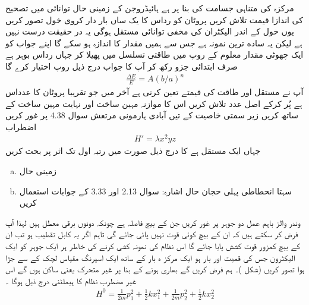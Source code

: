 مرکزہ کی متناہی جسامت کی بنا پر ہے ہائیڈروجن کے زمینی حال توانائی میں تصحیح کی اندازا قیمت تلاش کریں پروٹان کو رداس  کا یک ساں بار دار کروی خول تصور کریں یوں خول کے اندر الیکٹران ‏کی مخفی توانائی مستقل  ہوگی یہ در حقیقت درست نہیں ہے لیکن یہ ساده ترین نمونہ ہے جس سے ہمیں مقدار کا اندازہ ہو سکے گا اپنے جواب کو ایک چھوٹی مقدار معلوم  کے روپ میں طاقتی تسلسل میں پھیلا کر جہاں  رداس بوہر ہے صرف ابتدائی جزو رکھ کر آپ کا جواب درج ذیل روپ اختیار کرے گا 
\begin{align*}
\frac{\Delta E}{E} = A (b/a)^n
\end{align*}
آپ نے مستقل  اور طاقت  کی قیمتے تعین کرنی ہے آخر میں  جو تقریبا پروٹان کا عدداس ہے پُر کرکے اصل عدد تلاش کریں اس کا موازنہ مہین ساخت اور نہایت مہین ساخت کے ساتھ کریں 
زیر سمتی خاصیت کے تیں آبادی ہارمونی مرتعش سوال 4.38 پر غور کریں اضطراب
\begin{align*} 
H' = \lambda x^2 y z
\end{align*}
جہاں  ایک مستقل ہے کا درج ذیل صورت میں رتبہ اول تک اثر پر بحث کریں 
\begin{enumerate}[a.]
\item
زمینی حال 
\item
سہتا انحطاطی پہلی حجان حال اشارہ: سوال 2.13 اور 3.33 کے جوابات استعمال کریں 
\end{enumerate}
وندر والز باہم عمل دو جوہر پر غور کریں جن کے بیچ فاصلہ  ہے چونکہ دونوں برقی معطل ہیں لہذا آپ فرض کر سکتے ہیں کہ ان کے بیچ کوئی قوت نہیں پائی جائے گی تاہم اگر یہ کابل تقطیب ہو تب ان کے بیچ کمزور قوت کشش پایا جائے گا اس نظام کی نمونہ کشی کرنے کی خاطر ہر ایک جوہر کو ایک الیکٹرون جس کی قمیت  اور بار  ہو ایک مرکز ہ بار  کے ساتھ ایک اسپرنگ مقیاس لچک کے سے جڑا ہوا تصور کریں  (شکل  )۔   ہم فرض کریں گے بھاری ہونے کے بنا پر غیر متحرک یعنی ساکن ہوں گے اس غیر مضطرب نظام کا ہیملٹنی درج ذیل ہوگا ۔
\begin{align}
H^0 = \frac{1}{2m} p_1^2 + \frac{1}{2} k x_1^2 + \frac{1}{2m} p_2^2 + \frac{1}{2} k x_2^2
\end{align}
